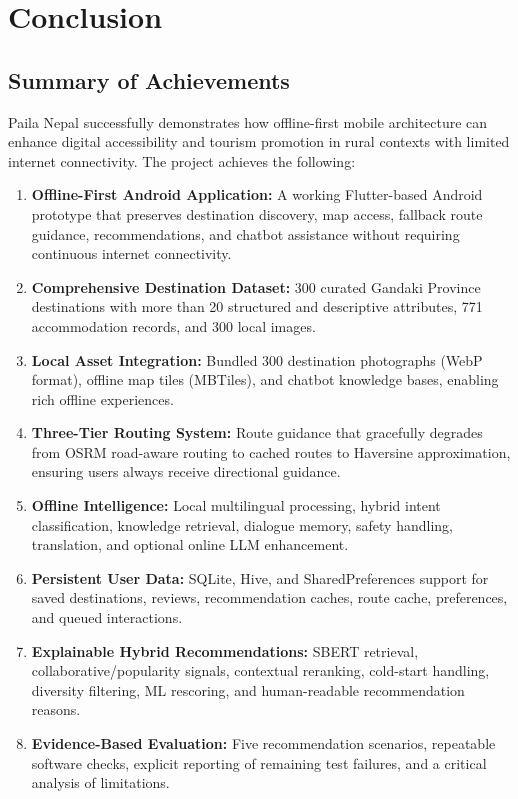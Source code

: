 \documentclass[12pt,a4paper,oneside]{report}
\begin{document}
\chapter{Conclusion}
\label{ch:conclusion}

\section{Summary of Achievements}
\label{sec:summary}

Paila Nepal successfully demonstrates how offline-first mobile architecture can enhance digital accessibility and tourism promotion in rural contexts with limited internet connectivity. The project achieves the following:

\begin{enumerate}
\item \textbf{Offline-First Android Application:} A working Flutter-based Android prototype that preserves destination discovery, map access, fallback route guidance, recommendations, and chatbot assistance without requiring continuous internet connectivity.

\item \textbf{Comprehensive Destination Dataset:} 300 curated Gandaki Province destinations with more than 20 structured and descriptive attributes, 771 accommodation records, and 300 local images.

\item \textbf{Local Asset Integration:} Bundled 300 destination photographs (WebP format), offline map tiles (MBTiles), and chatbot knowledge bases, enabling rich offline experiences.

\item \textbf{Three-Tier Routing System:} Route guidance that gracefully degrades from OSRM road-aware routing to cached routes to Haversine approximation, ensuring users always receive directional guidance.

\item \textbf{Offline Intelligence:} Local multilingual processing, hybrid intent classification, knowledge retrieval, dialogue memory, safety handling, translation, and optional online LLM enhancement.

\item \textbf{Persistent User Data:} SQLite, Hive, and SharedPreferences support for saved destinations, reviews, recommendation caches, route cache, preferences, and queued interactions.

\item \textbf{Explainable Hybrid Recommendations:} SBERT retrieval, collaborative/popularity signals, contextual reranking, cold-start handling, diversity filtering, ML rescoring, and human-readable recommendation reasons.

\item \textbf{Evidence-Based Evaluation:} Five recommendation scenarios, repeatable software checks, explicit reporting of remaining test failures, and a critical analysis of limitations.
\end{enumerate}
\end{document}
